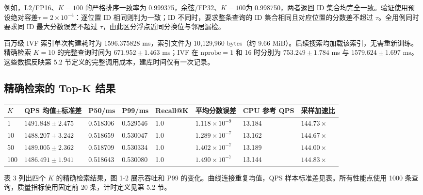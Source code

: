 \documentclass[UTF8,a4paper,zihao=5,fontset=none]{ctexart}
\begin{document}
例如，L2/FP16、$K=100$ 的严格排序一致率为 0.999375，余弦/FP32、$K=100$为 0.998750，两者返回 ID 集合均完全一致。验证使用预设绝对容差$\tau=2\times10^{-4}$：逐位置 ID 相同则判为一致；ID 不同时，要求整条查询的 ID 集合相同且对应位置的分数差不超过 $\tau$。全用例同时要求同 ID 最大分数误差不超过 $\tau$，由此区分浮点近同分换位与邻居漏检。


百万级 IVF 索引单次构建耗时为 1596.375828 ms，索引文件为 10,129,960 bytes（约 9.66 MiB）。后续搜索均加载该索引，无需重新训练。精确检索 $K=10$ 的完整查询时间为 $671.952\pm1.463$ ms；IVF 在 $\mathrm{nprobe}=1$ 和 16 时分别为 $753.249\pm1.784$ ms 与 $1579.624\pm1.697$ ms。这些数据反映第 5.2 节定义的完整调用成本，建库时间仅有一次记录。


\subsection{精确检索的 Top-K 结果}

\par\medskip\noindent\begin{minipage}{\linewidth}
\footnotesize
{}\label{tab:3}
\begin{tabular}{@{}C{7.828mm}R{31.310mm}R{17.790mm}R{17.790mm}R{16.367mm}R{20.636mm}R{16.367mm}R{14.232mm}@{}}
\toprule
\textbf{$K$} & \textbf{QPS 均值\ensuremath{\pm}标准差} & \textbf{P50/ms} & \textbf{P99/ms} & \textbf{Recall@K} & \textbf{平均分数误差} & \textbf{CPU 参考 QPS} & \textbf{采样加速比} \\
 & $1491.848\pm2.475$ & 0.518306 & 0.529546 & 1.0 & $1.118\times10^{-9}$ & 13.184 & $144.73\times$ \\
10 & $1488.207\pm3.242$ & 0.518659 & 0.530047 & 1.0 & $1.289\times10^{-7}$ & 13.162 & $144.67\times$ \\
50 & $1489.005\pm2.362$ & 0.518709 & 0.530334 & 1.0 & $1.402\times10^{-7}$ & 13.189 & $144.00\times$ \\
100 & $1486.491\pm1.941$ & 0.518643 & 0.530080 & 1.0 & $1.490\times10^{-7}$ & 13.144 & $144.83\times$ \\
\bottomrule
\end{tabular}
\end{minipage}\par\medskip

表 3 列出四个 $K$ 的精确检索结果，图 1-2 展示吞吐和 P99 的变化。曲线连接重复均值，QPS 样本标准差见表。所有性能点使用 1000 条查询，质量指标使用固定前 20 条，计时定义见第 5.2 节。
\end{document}
